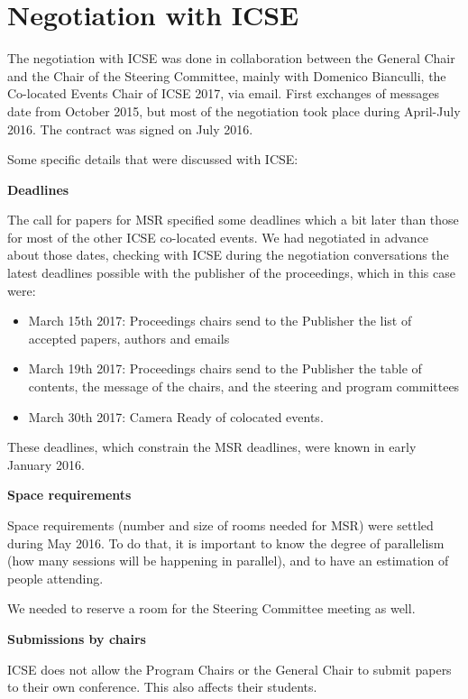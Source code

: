 \documentclass[a4paper]{report}
\begin{document}
\section{Negotiation with ICSE}

The negotiation with ICSE was done in collaboration between the General Chair and the Chair of the Steering Committee, mainly with Domenico Bianculli, the Co-located Events Chair of ICSE 2017, via email. First exchanges of messages date from October 2015, but most of the negotiation took place during April-July 2016. The contract was signed on July 2016.

Some specific details that were discussed with ICSE:

\textbf{Deadlines}

The call for papers for MSR specified some deadlines which a bit later than those for most of the other ICSE co-located events. We had negotiated in advance about those dates, checking with ICSE during the negotiation conversations the latest deadlines possible with the publisher of the proceedings, which in this case were:

\begin{itemize}
\item March 15th 2017: Proceedings chairs send to the Publisher the list of accepted papers, authors and emails
\item March 19th 2017: Proceedings chairs send to the Publisher the table of contents, the message of the chairs, and the steering and program committees 
\item March 30th 2017: Camera Ready of colocated events.
\end{itemize}

These deadlines, which constrain the MSR deadlines, were known in early January 2016.

\textbf{Space requirements}

Space requirements (number and size of rooms needed for MSR) were settled during May 2016. To do that, it is important to know the degree of parallelism (how many sessions will be happening in parallel), and to have an estimation of people attending.

We needed to reserve a room for the Steering Committee meeting as well.

\textbf{Submissions by chairs}

ICSE does not allow the Program Chairs or the General Chair to submit papers to their own conference. This also affects their students.
\end{document}
